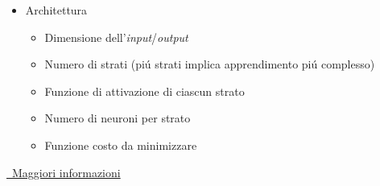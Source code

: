 \begin{frame}[t,fragile]
{{{\begin{minipage}[t]{\textwidth}
\begin{minipage}[t]{.4\textwidth}
\begin{itemize}[leftmargin=10pt,align=right]
\begin{minipage}[t]{\textwidth}
					\end{minipage}
				\end{itemize}
			\end{minipage}
			\hfill
			\begin{minipage}[t]{.5\textwidth}
				\begin{itemize}[leftmargin=10pt,align=right]
					\item[\alert{\faHandORight}] Architettura
					\begin{itemize}[leftmargin=20pt,align=right]
						\item[\alert{\faHandORight}] Dimensione dell'\emph{input}/\emph{output}
			 			\item[\alert{\faHandORight}] Numero di strati (pi\'{u} strati implica apprendimento pi\'{u} complesso)
						\item[\alert{\faHandORight}] Funzione di attivazione di ciascun strato
						\item[\alert{\faHandORight}] Numero di neuroni per strato
						\item[\alert{\faHandORight}] Funzione costo da minimizzare
					\end{itemize}
				\end{itemize}
			\end{minipage}
			\begin{center}
				\hyperlink{subsec:cnn}{\color{venis-faithful-yellow}\faLink\ Maggiori informazioni}
			\end{center}		
		\end{minipage}
		}
	}
}
\end{frame}
